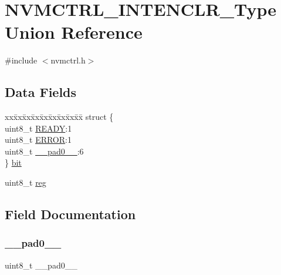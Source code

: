 \hypertarget{union_n_v_m_c_t_r_l___i_n_t_e_n_c_l_r___type}{}\section{N\+V\+M\+C\+T\+R\+L\+\_\+\+I\+N\+T\+E\+N\+C\+L\+R\+\_\+\+Type Union Reference}
\label{union_n_v_m_c_t_r_l___i_n_t_e_n_c_l_r___type}


{\ttfamily \#include $<$nvmctrl.\+h$>$}

\subsection*{Data Fields}
\begin{DoxyCompactItemize}
\item 
\begin{tabbing}
xx\=xx\=xx\=xx\=xx\=xx\=xx\=xx\=xx\=\kill
struct \{\\
\>uint8\_t \mbox{\hyperlink{union_n_v_m_c_t_r_l___i_n_t_e_n_c_l_r___type_a87c971ad119330af2fdb7bca4011addb}{READY}}:1\\
\>uint8\_t \mbox{\hyperlink{union_n_v_m_c_t_r_l___i_n_t_e_n_c_l_r___type_a4be51829c8720b7d159b77c39924afaa}{ERROR}}:1\\
\>uint8\_t \mbox{\hyperlink{union_n_v_m_c_t_r_l___i_n_t_e_n_c_l_r___type_a8b4eebe79ded0459acec2f4950102ba3}{\_\_pad0\_\_}}:6\\
\} \mbox{\hyperlink{union_n_v_m_c_t_r_l___i_n_t_e_n_c_l_r___type_a71c1ebbf3190424e3a6feb0dad12ddfb}{bit}}\\

\end{tabbing}\item 
uint8\+\_\+t \mbox{\hyperlink{union_n_v_m_c_t_r_l___i_n_t_e_n_c_l_r___type_a9428adc9af4653a2050e2536b55dec8d}{reg}}
\end{DoxyCompactItemize}


\subsection{Field Documentation}
\mbox{\label{union_n_v_m_c_t_r_l___i_n_t_e_n_c_l_r___type_a8b4eebe79ded0459acec2f4950102ba3}} 
\subsubsection{\texorpdfstring{\_\_pad0\_\_}{\_\_pad0\_\_}}
{\footnotesize\ttfamily uint8\+\_\+t \+\_\+\+\_\+pad0\+\_\+\+\_\+}

